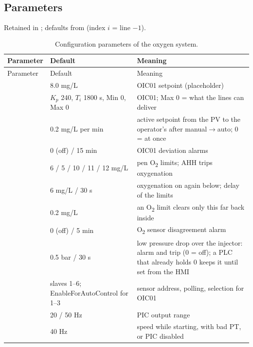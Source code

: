 \documentclass[11pt,a4paper]{article}
\newcommand{\Otwo}{O\textsubscript{2}}
\begin{document}
\subsection{Parameters}
\label{sec:params}
Retained in ; defaults from   (index $i$ = line $-1$).
\begin{small}
\begin{longtable}{@{}P{62mm}P{30mm}P{62mm}@{}}
\caption{Configuration parameters of the oxygen system.}\label{tab:params}\\
\toprule
Parameter & Default & Meaning \\
\midrule
\endfirsthead
\toprule
Parameter & Default & Meaning \\
\midrule
\endhead
\bottomrule
\endfoot
{} & 8.0 mg/L & OIC01 setpoint (placeholder) \\
 & $K_p$ 240, $T_i$ 1800 s, Min 0, Max 0 & OIC01; Max 0 = what the lines can deliver \\
 & 0.2 mg/L per min & active setpoint from the PV to the operator's after manual$\to$auto; 0 = at once \\
 & 0 (off) / 15 min & OIC01 deviation alarms \\
 & 6 / 5 / 10 / 11 / 12 mg/L & pen \Otwo{} limits; AHH trips oxygenation \\
 & 6 mg/L / 30 s & oxygenation on again below; delay of the limits \\
 & 0.2 mg/L & an \Otwo{} limit clears only this far back inside \\
 & 0 (off) / 5 min & \Otwo{} sensor disagreement alarm \\
 & 0.5 bar / 30 s & low pressure drop over the injector: alarm and trip (0 = off); a PLC that already holds 0 keeps it until set from the HMI \\
 & slaves 1--6; EnableForAutoControl for 1--3 & sensor address, polling, selection for OIC01 \\
 & 20 / 50 Hz & PIC output range \\
 & 40 Hz & speed while starting, with bad PT, or PIC disabled \\

\end{longtable}
\end{small}
\end{document}
